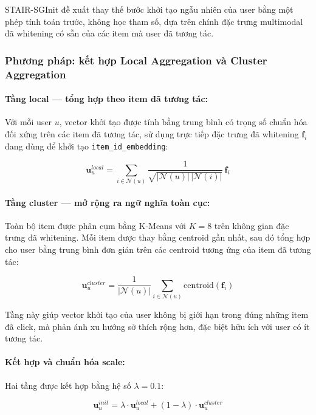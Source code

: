 \begin{longtable}
STAIR-SGInit đề xuất thay thế bước khởi tạo ngẫu nhiên của user bằng một phép tính toán trước, không học tham số, dựa trên chính đặc trưng multimodal đã whitening có sẵn của các item mà user đã tương tác.
 
\subsubsection{Phương pháp: kết hợp Local Aggregation và Cluster Aggregation}
 
\paragraph{Tầng local — tổng hợp theo item đã tương tác:}
Với mỗi user $u$, vector khởi tạo được tính bằng trung bình có trọng số chuẩn hóa đối xứng trên các item đã tương tác, sử dụng trực tiếp đặc trưng đã whitening $\mathbf{f}_i$ đang dùng để khởi tạo \texttt{item\_id\_embedding}:
 
\begin{equation}
\mathbf{u}_u^{local} = \sum_{i \in \mathcal{N}(u)} \frac{1}{\sqrt{|\mathcal{N}(u)|\,|\mathcal{N}(i)|}} \, \mathbf{f}_i
\end{equation}
 
\paragraph{Tầng cluster — mở rộng ra ngữ nghĩa toàn cục:}
Toàn bộ item được phân cụm bằng K-Means với $K=8$ trên không gian đặc trưng đã whitening. Mỗi item được thay bằng centroid gần nhất, sau đó tổng hợp cho user bằng trung bình đơn giản trên các centroid tương ứng của item đã tương tác:
 
\begin{equation}
\mathbf{u}_u^{cluster} = \frac{1}{|\mathcal{N}(u)|} \sum_{i \in \mathcal{N}(u)} \text{centroid}(\mathbf{f}_i)
\end{equation}
 
Tầng này giúp vector khởi tạo của user không bị giới hạn trong đúng những item đã click, mà phản ánh xu hướng sở thích rộng hơn, đặc biệt hữu ích với user có ít tương tác.
 
\paragraph{Kết hợp và chuẩn hóa scale:}
Hai tầng được kết hợp bằng hệ số $\lambda = 0.1$:
 
\begin{equation}
\mathbf{u}_u^{init} = \lambda \cdot \mathbf{u}_u^{local} + (1-\lambda) \cdot \mathbf{u}_u^{cluster}
\end{equation}
 

\end{longtable}
